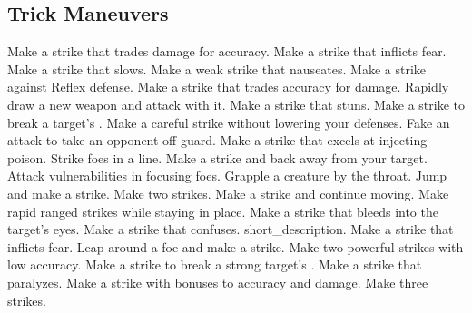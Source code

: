 \subsection{Trick Maneuvers}\label{Trick Maneuvers}
\begin{spelllist}
 Make a strike that trades damage for accuracy.
 Make a strike that inflicts fear.
 Make a strike that slows.
 Make a weak strike that nauseates.
 Make a strike against Reflex defense.
 Make a strike that trades accuracy for damage.
 Rapidly draw a new weapon and attack with it.
 Make a strike that stuns.
 Make a strike to break a target's .
 Make a careful strike without lowering your defenses.
 Fake an attack to take an opponent off guard.
 Make a strike that excels at injecting poison.
 Strike foes in a line.
 Make a strike and back away from your target.
 Attack vulnerabilities in focusing foes.
 Grapple a creature by the throat.
 Jump and make a strike.
 Make two strikes.
 Make a strike and continue moving.
 Make rapid ranged strikes while staying in place.
 Make a strike that bleeds into the target's eyes.
 Make a strike that confuses.
 short_description.
 Make a strike that inflicts fear.
 Leap around a foe and make a strike.
 Make two powerful strikes with low accuracy.
 Make a strike to break a strong target's .
 Make a strike that paralyzes.
 Make a strike with bonuses to accuracy and damage.
 Make three strikes.
\end{spelllist}



\small
